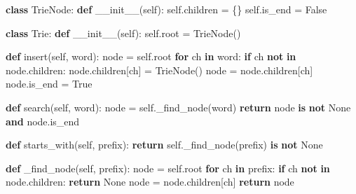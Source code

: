 \documentclass[11pt]{article}
\newenvironment{Shaded}{\begin{snugshade}}{\end{snugshade}}
\newcommand{\ControlFlowTok}[1]{\textcolor[rgb]{0.99,0.74,0.29}{\textbf{#1}}}
\newcommand{\FunctionTok}[1]{\textcolor[rgb]{0.56,0.27,0.68}{#1}}
\newcommand{\KeywordTok}[1]{\textcolor[rgb]{0.81,0.81,0.76}{\textbf{#1}}}
\newcommand{\NormalTok}[1]{\textcolor[rgb]{0.81,0.81,0.76}{#1}}
\newcommand{\OperatorTok}[1]{\textcolor[rgb]{0.81,0.81,0.76}{#1}}
\newcommand{\VariableTok}[1]{\textcolor[rgb]{0.15,0.68,0.68}{#1}}
\begin{document}
\begin{Shaded}
\begin{Highlighting}[]
\KeywordTok{class}\NormalTok{ TrieNode:}
    \KeywordTok{def} \FunctionTok{\_\_init\_\_}\NormalTok{(}\VariableTok{self}\NormalTok{):}
        \VariableTok{self}\NormalTok{.children }\OperatorTok{=}\NormalTok{ \{\}}
        \VariableTok{self}\NormalTok{.is\_end }\OperatorTok{=} \VariableTok{False}

\KeywordTok{class}\NormalTok{ Trie:}
    \KeywordTok{def} \FunctionTok{\_\_init\_\_}\NormalTok{(}\VariableTok{self}\NormalTok{):}
        \VariableTok{self}\NormalTok{.root }\OperatorTok{=}\NormalTok{ TrieNode()}

    \KeywordTok{def}\NormalTok{ insert(}\VariableTok{self}\NormalTok{, word):}
\NormalTok{        node }\OperatorTok{=} \VariableTok{self}\NormalTok{.root}
        \ControlFlowTok{for}\NormalTok{ ch }\KeywordTok{in}\NormalTok{ word:}
            \ControlFlowTok{if}\NormalTok{ ch }\KeywordTok{not} \KeywordTok{in}\NormalTok{ node.children:}
\NormalTok{                node.children[ch] }\OperatorTok{=}\NormalTok{ TrieNode()}
\NormalTok{            node }\OperatorTok{=}\NormalTok{ node.children[ch]}
\NormalTok{        node.is\_end }\OperatorTok{=} \VariableTok{True}

    \KeywordTok{def}\NormalTok{ search(}\VariableTok{self}\NormalTok{, word):}
\NormalTok{        node }\OperatorTok{=} \VariableTok{self}\NormalTok{.\_find\_node(word)}
        \ControlFlowTok{return}\NormalTok{ node }\KeywordTok{is} \KeywordTok{not} \VariableTok{None} \KeywordTok{and}\NormalTok{ node.is\_end}

    \KeywordTok{def}\NormalTok{ starts\_with(}\VariableTok{self}\NormalTok{, prefix):}
        \ControlFlowTok{return} \VariableTok{self}\NormalTok{.\_find\_node(prefix) }\KeywordTok{is} \KeywordTok{not} \VariableTok{None}

    \KeywordTok{def}\NormalTok{ \_find\_node(}\VariableTok{self}\NormalTok{, prefix):}
\NormalTok{        node }\OperatorTok{=} \VariableTok{self}\NormalTok{.root}
        \ControlFlowTok{for}\NormalTok{ ch }\KeywordTok{in}\NormalTok{ prefix:}
            \ControlFlowTok{if}\NormalTok{ ch }\KeywordTok{not} \KeywordTok{in}\NormalTok{ node.children:}
                \ControlFlowTok{return} \VariableTok{None}
\NormalTok{            node }\OperatorTok{=}\NormalTok{ node.children[ch]}
        \ControlFlowTok{return}\NormalTok{ node}
\end{Highlighting}
\end{Shaded}
\end{document}
